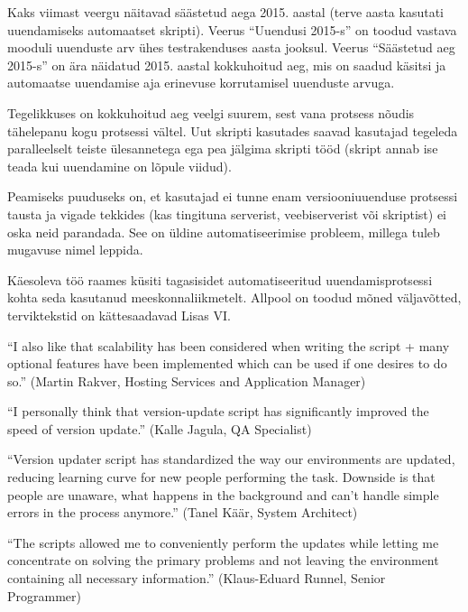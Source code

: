 \documentclass[12pt]{article}
\begin{document}
  Kaks viimast veergu näitavad säästetud aega 2015. aastal (terve aasta kasutati uuendamiseks automaatset skripti). Veerus ``Uuendusi 2015-s'' on toodud vastava mooduli uuenduste arv ühes testrakenduses aasta jooksul. Veerus ``Säästetud aeg 2015-s'' on ära näidatud 2015. aastal kokkuhoitud aeg, mis on saadud käsitsi ja automaatse uuendamise aja erinevuse korrutamisel uuenduste arvuga.
  
  Tegelikkuses on kokkuhoitud aeg veelgi suurem, sest vana protsess nõudis tähelepanu kogu protsessi vältel. Uut skripti kasutades saavad kasutajad tegeleda paralleelselt teiste ülesannetega ega pea jälgima skripti tööd (skript annab ise teada kui uuendamine on lõpule viidud).
  
  Peamiseks puuduseks on, et kasutajad ei tunne enam versiooniuuenduse protsessi tausta ja vigade tekkides (kas tingituna serverist, veebiserverist või skriptist) ei oska neid parandada. See on üldine automatiseerimise probleem, millega tuleb mugavuse nimel leppida.
  
   Käesoleva töö raames küsiti tagasisidet automatiseeritud uuendamisprotsessi kohta seda kasutanud meeskonnaliikmetelt. Allpool on toodud mõned väljavõtted, terviktekstid on kättesaadavad Lisas VI.
   
   \begin{displayquote}
   ``I also like that scalability has been considered when writing the script + many optional features have been implemented which can be used if one desires to do so.'' (Martin Rakver, Hosting Services and Application Manager)
   \end{displayquote}
   
   \begin{displayquote}
   ``I personally think that version-update script has significantly improved the speed of version update.'' (Kalle Jagula, QA Specialist)
   \end{displayquote}
   
   \begin{displayquote}
    ``Version updater script has standardized the way our environments are updated, reducing learning curve for new people performing the task. Downside is that people are unaware, what happens in the background and can't handle simple errors in the process anymore.'' (Tanel Käär, System Architect)
    \end{displayquote}
    
    \begin{displayquote}
    ``The scripts allowed me to conveniently perform the updates while letting me concentrate on solving the primary problems and not leaving the environment containing all necessary information.'' (Klaus-Eduard Runnel, Senior Programmer)
    \end{displayquote}
    
\end{document}
